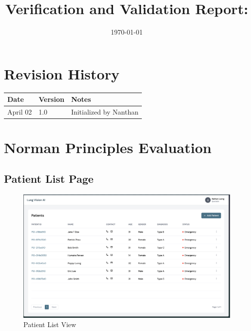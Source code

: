 \documentclass[12pt, titlepage]{article}
\begin{document}
\title{Verification and Validation Report: \progname} 
\author{\authname}
\date{\today}
	
\maketitle


\section{Revision History}
\begin{tabularx}{\textwidth}{p{3cm}p{2cm}X}
\toprule {\bf Date} & {\bf Version} & {\bf Notes}\\
\midrule
April 02 & 1.0 & Initialized by Nanthan\\

\bottomrule
\end{tabularx}


\newpage
\tableofcontents
\listoftables %
\listoffigures %
\section{Norman Principles Evaluation}
\newpage



\subsection{Patient List Page}

  \begin{figure}[ht!] 
    \centering
    \includegraphics[scale=0.25]{../assets/patient_list.png}
    \caption{Patient List View}
    \label{fig:patient_list}
  \end{figure}
\end{document}
